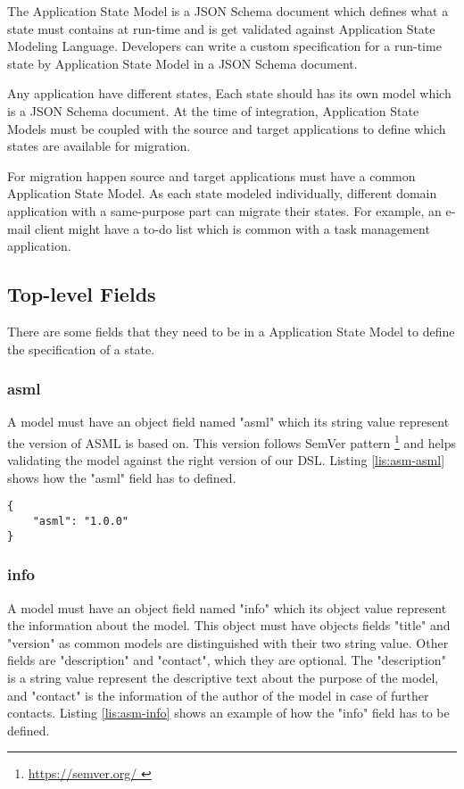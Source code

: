 
The Application State Model is a JSON Schema document which defines what a state must contains at run-time and is get validated against Application State Modeling Language. Developers can write a custom specification for a run-time state by Application State Model in a JSON Schema document.

Any application have different states, Each state should has its own model which is a JSON Schema document. At the time of integration, Application State Models must be coupled with the source and target applications to define which states are available for migration.

For migration happen source and target applications must have a common Application State Model. As each state modeled individually, different domain application with a same-purpose part can migrate their states. For example, an e-mail client might have a to-do list which is common with a task management application.




\subsection{Top-level Fields}
There are some fields that they need to be in a Application State Model to define the specification of a state.

\subsubsection{asml}
A model must have an object field named "asml" which its string value represent the version of ASML is based on. This version follows SemVer pattern \footnote{\href{https://semver.org/}{https://semver.org/
}} and helps validating the model against the right version of our DSL. Listing \ref{lis:asm-asml} shows how the "asml" field has to defined.

\lstset{
  label=lis:asm-asml, caption=Application State Model "asml" field example., 
  basicstyle=\ttfamily\footnotesize, frame=single, captionpos=b,
  xleftmargin=.15\textwidth, xrightmargin=.15\textwidth
}
\begin{lstlisting}
{
    "asml": "1.0.0"
}
\end{lstlisting}
\subsubsection{info}
A model must have an object field named "info" which its object value represent the information about the model. This object must have objects fields "title" and "version" as common models are distinguished with their two string value. Other fields are "description" and "contact", which they are optional. The "description" is a string value represent the descriptive text about the purpose of the model, and "contact" is the information of the author of the model in case of further contacts. Listing \ref{lis:asm-info} shows an example of how the "info" field has to be defined.

